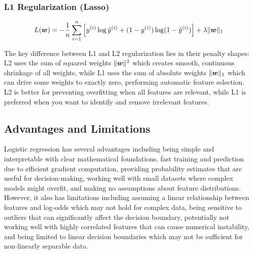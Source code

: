 \subsubsection{L1 Regularization (Lasso)}

\begin{equation}
L(\boldsymbol{w}) = -\frac{1}{n} \sum_{i=1}^{n} \left[y^{(i)} \log \hat{y}^{(i)} + (1-y^{(i)}) \log(1-\hat{y}^{(i)})\right] + \lambda \|\boldsymbol{w}\|_1
\end{equation}

\begin{remark}
The key difference between L1 and L2 regularization lies in their penalty shapes: L2 uses the sum of squared weights $\|\boldsymbol{w}\|^2$ which creates smooth, continuous shrinkage of all weights, while L1 uses the sum of absolute weights $\|\boldsymbol{w}\|_1$ which can drive some weights to exactly zero, performing automatic feature selection. L2 is better for preventing overfitting when all features are relevant, while L1 is preferred when you want to identify and remove irrelevant features.
\end{remark}

\subsection{Advantages and Limitations}

Logistic regression has several advantages including being simple and interpretable with clear mathematical foundations, fast training and prediction due to efficient gradient computation, providing probability estimates that are useful for decision-making, working well with small datasets where complex models might overfit, and making no assumptions about feature distributions. However, it also has limitations including assuming a linear relationship between features and log-odds which may not hold for complex data, being sensitive to outliers that can significantly affect the decision boundary, potentially not working well with highly correlated features that can cause numerical instability, and being limited to linear decision boundaries which may not be sufficient for non-linearly separable data.

